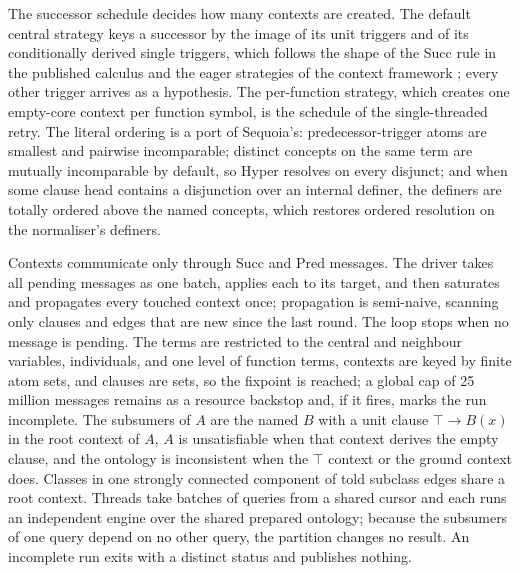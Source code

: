 The successor schedule decides how many contexts are created.  The default
central strategy keys a successor by the image of its unit triggers and of its
conditionally derived single triggers, which follows the shape of the Succ
rule in the published calculus \cite{bate2016sriq} and the eager strategies
of the context framework \cite{simancik2014fpt}; every other trigger arrives as
a hypothesis.  The per-function strategy, which creates one empty-core context
per function symbol, is the schedule of the single-threaded retry.  The literal
ordering is a port of Sequoia's: predecessor-trigger atoms are smallest and
pairwise incomparable; distinct concepts on the same term are mutually
incomparable by default, so Hyper resolves on every disjunct; and when some
clause head contains a disjunction over an internal definer, the definers are
totally ordered above the named concepts, which restores ordered resolution on
the normaliser's definers.

Contexts communicate only through Succ and Pred messages.  The driver takes all
pending messages as one batch, applies each to its target, and then saturates
and propagates every touched context once; propagation is semi-naive, scanning
only clauses and edges that are new since the last round.  The loop stops when
no message is pending.  The terms are restricted to the central and neighbour
variables, individuals, and one level of function terms, contexts are keyed by
finite atom sets, and clauses are sets, so the fixpoint is reached; a global
cap of 25 million messages remains as a resource backstop and, if it fires,
marks the run incomplete.  The subsumers of $A$ are the named $B$ with a unit
clause $\top\rightarrow B(x)$ in the root context of $A$, $A$ is unsatisfiable
when that context derives the empty clause, and the ontology is inconsistent
when the $\top$ context or the ground context does.  Classes in one strongly
connected component of told subclass edges share a root context.  Threads
take batches of queries from a shared cursor and each runs an independent
engine over the shared prepared ontology; because the subsumers of one query
depend on no other query, the partition changes no result.  An incomplete run
exits with a distinct status and publishes nothing.

